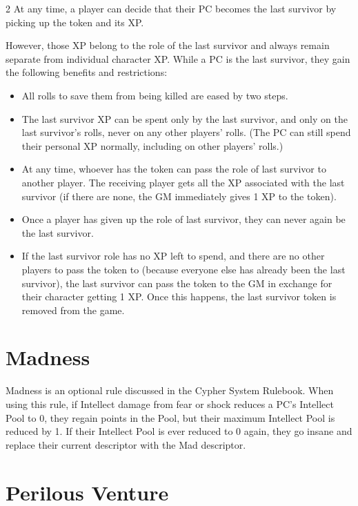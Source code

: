 \begin{multicols}{2}
At any time, a player can decide that their PC becomes the last survivor by picking up the token and its XP.

However, those XP belong to the role of the last survivor and always remain separate from individual character XP. While a PC is the last survivor, they gain the following benefits and restrictions:

\begin{itemize} 
\item All rolls to save them from being killed are eased by two steps.
\item The last survivor XP can be spent only by the last survivor, and only on the last survivor’s rolls, never on any other players’ rolls. (The PC can still spend their personal XP normally, including on other players’ rolls.)
\item At any time, whoever has the token can pass the role of last survivor to another player. The receiving player gets all the XP associated with the last survivor (if there are none, the GM immediately gives 1 XP to the token).
\item Once a player has given up the role of last survivor, they can never again be the last survivor.
\item If the last survivor role has no XP left to spend, and there are no other players to pass the token to (because everyone else has already been the last survivor), the last survivor can pass the token to the GM in exchange for their character getting 1 XP. Once this happens, the last survivor token is removed from the game.
\end{itemize}

\section{Madness}

Madness is an optional rule discussed in the Cypher System Rulebook. When using this rule, if Intellect damage from fear or shock reduces a PC’s Intellect Pool to 0, they regain points in the Pool, but their maximum Intellect Pool is reduced by 1. If their Intellect Pool is ever reduced to 0 again, they go insane and replace their current descriptor with the Mad descriptor.

\section{Perilous Venture}


\end{multicols}
